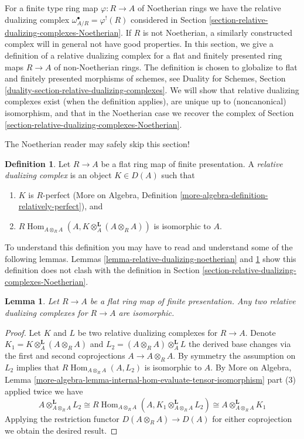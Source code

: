\documentclass{stacks-project}
\theoremstyle{plain}
\newtheorem{lemma}[subsection]{Lemma}
\theoremstyle{definition}
\newtheorem{definition}[subsection]{Definition}
\theoremstyle{remark}
\numberwithin{equation}{subsection}
\def\Hom{\mathop{\mathrm{Hom}}\nolimits}
\begin{document}
\noindent
For a finite type ring map $\varphi : R \to A$ of Noetherian rings
we have the relative dualizing complex $\omega_{A/R}^\bullet = \varphi^!(R)$
considered in Section \ref{section-relative-dualizing-complexes-Noetherian}.
If $R$ is not Noetherian, a similarly constructed complex will
in general not have good properties. In this section, we give a
definition of a relative dualizing complex for a flat and finitely presented
ring maps $R \to A$ of non-Noetherian rings. The definition is
chosen to globalize to flat and finitely presented morphisms
of schemes, see Duality for Schemes, Section
\ref{duality-section-relative-dualizing-complexes}. We will
show that relative dualizing complexes exist (when the definition
applies), are unique up to (noncanonical) isomorphism,
and that in the Noetherian case we recover the complex of
Section \ref{section-relative-dualizing-complexes-Noetherian}.

\medskip\noindent
The Noetherian reader may safely skip this section!

\begin{definition}
\label{definition-relative-dualizing-complex}
Let $R \to A$ be a flat ring map of finite presentation.
A {\it relative dualizing complex} is an object $K \in D(A)$ such that
\begin{enumerate}
\item $K$ is $R$-perfect (More on Algebra, Definition
\ref{more-algebra-definition-relatively-perfect}), and
\item $R\Hom_{A \otimes_R A}(A, K \otimes_A^\mathbf{L} (A \otimes_R A))$
is isomorphic to $A$.
\end{enumerate}
\end{definition}

\noindent
To understand this definition you may have to read and understand some
of the following lemmas. Lemmas \ref{lemma-relative-dualizing-noetherian} and
\ref{lemma-uniqueness-relative-dualizing} show this definition
does not clash with the definition in
Section \ref{section-relative-dualizing-complexes-Noetherian}.

\begin{lemma}
\label{lemma-uniqueness-relative-dualizing}
Let $R \to A$ be a flat ring map of finite presentation.
Any two relative dualizing complexes for $R \to A$ are isomorphic.
\end{lemma}

\begin{proof}
Let $K$ and $L$ be two relative dualizing complexes for $R \to A$.
Denote $K_1 = K \otimes_A^\mathbf{L} (A \otimes_R A)$
and $L_2 = (A \otimes_R A) \otimes_A^\mathbf{L} L$ the
derived base changes via the first and second coprojections
$A \to A \otimes_R A$. By symmetry the assumption on $L_2$
implies that $R\Hom_{A \otimes_R A}(A, L_2)$ is isomorphic to $A$.
By More on Algebra, Lemma
\ref{more-algebra-lemma-internal-hom-evaluate-tensor-isomorphism} part (3)
applied twice we have
$$
A \otimes_{A \otimes_R A}^\mathbf{L} L_2 \cong
R\Hom_{A \otimes_R A}(A, K_1 \otimes_{A \otimes_R A}^\mathbf{L} L_2) \cong
A \otimes_{A \otimes_R A}^\mathbf{L} K_1
$$
Applying the restriction functor $D(A \otimes_R A) \to D(A)$
for either coprojection we obtain the desired result.
\end{proof}
\end{document}
